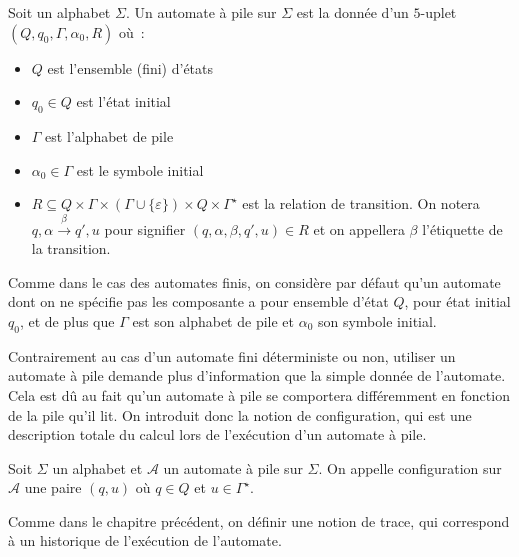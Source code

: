 \begin{definition}
    Soit un alphabet $\Sigma$. Un automate à pile sur $\Sigma$ est la donnée d'un
    $5$-uplet $(Q,q_0,\Gamma,\alpha_0,R)$ où~:
    \begin{itemize}
        \item $Q$ est l'ensemble (fini) d'états
        \item $q_0 \in Q$ est l'état initial
        \item $\Gamma$ est l'alphabet de pile
        \item $\alpha_0 \in \Gamma$ est le symbole initial
        \item 
        $R \subseteq Q \times \Gamma\times (\Gamma\cup \{\varepsilon\})\times
        Q \times \Gamma^\star$ est la relation de transition.
        On notera $q,\alpha \xrightarrow{\beta} q',u$ pour signifier
        $(q,\alpha,\beta,q',u) \in R$ et on appellera $\beta$ l'étiquette de
        la transition.
    \end{itemize}
\end{definition}

\begin{notation}
    Comme dans le cas des automates finis, on considère par défaut qu'un automate
    dont on ne spécifie pas les composante a pour ensemble d'état $Q$, pour état
    initial $q_0$, et de plus que $\Gamma$ est son alphabet de pile et $\alpha_0$
    son symbole initial.
\end{notation}

Contrairement au cas d'un automate fini déterministe ou non, utiliser un automate à
pile demande plus d'information que la simple donnée de l'automate. Cela est dû au
fait qu'un automate à pile se comportera différemment en fonction de la pile qu'il lit.
On introduit donc la notion de configuration, qui est une description totale du
calcul lors de l'exécution d'un automate à pile.

\begin{definition}[Configuration]
    Soit $\Sigma$ un alphabet et $\mathcal A$ un automate à pile sur $\Sigma$. On
    appelle configuration sur $\mathcal A$ une paire $(q,u)$ où $q \in Q$ et
    $u \in \Gamma^\star$.
\end{definition}

Comme dans le chapitre précédent, on définir une notion de trace, qui correspond à
un historique de l'exécution de l'automate.

